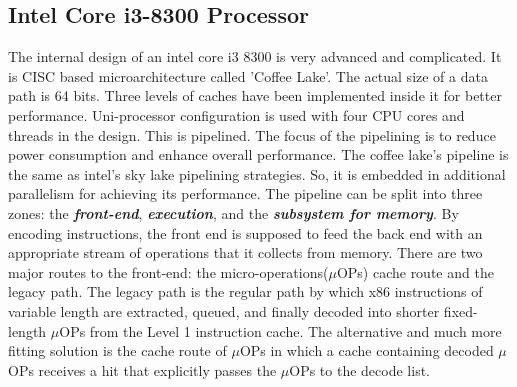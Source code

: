 \documentclass[a4paper,11pt]{article}
\begin{document}
\subsection{Intel Core i3-8300 Processor}
The internal design of an intel core i3 8300 is very advanced and complicated. It is CISC based microarchitecture called 'Coffee Lake'.  The actual size of a data path is 64 bits. Three levels of caches have been implemented inside it for better performance. Uni-processor configuration is used with four CPU cores and threads in the design. This is pipelined. The focus of the pipelining is to reduce power consumption and enhance overall performance. The coffee lake's pipeline is the same as intel's sky lake pipelining strategies. So, it is embedded in additional parallelism for achieving its performance. The pipeline can be split into three zones: the \textbf{\textit{front-end}}, \textit{\textbf{execution}}, and the \textbf{\textit{subsystem for memory}}. By encoding instructions, the front end is supposed to feed the back end with an appropriate stream of operations that it collects from memory. There are two major routes to the front-end: the micro-operations($\mu$OPs) cache route and the legacy path. The legacy path is the regular path by which x86 instructions of variable length are extracted, queued, and finally decoded into shorter fixed-length $\mu$OPs from the Level 1 instruction cache. The alternative and much more fitting solution is the cache route of $\mu$OPs in which a cache containing decoded $\mu$OPs receives a hit that explicitly passes the $\mu$OPs to the decode list.\\
\end{document}
